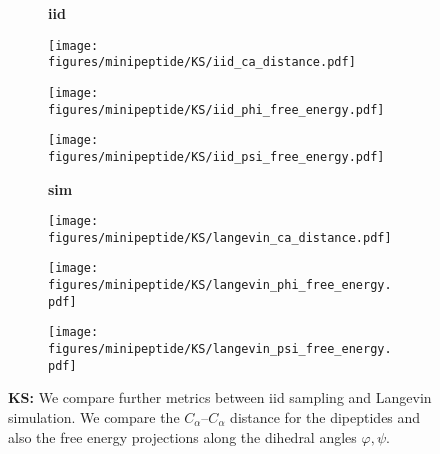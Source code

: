 \begin{figure}
    \centering
    \begin{minipage}{\textwidth}
        \centering
        \begin{subfigure}[c]{0.08\textwidth}
            \textbf{iid}
        \end{subfigure}
        \begin{subfigure}[c]{0.2\textwidth}
            \centering
            \texttt{[image: figures/minipeptide/KS/iid\_ca\_distance.pdf]}            
        \end{subfigure}
        \hspace{0.5cm}
        \begin{subfigure}[c]{0.2\textwidth}
            \centering
            \texttt{[image: figures/minipeptide/KS/iid\_phi\_free\_energy.pdf]}
        \end{subfigure}
        \hspace{0.5cm}
        \begin{subfigure}[c]{0.2\textwidth}
            \centering
            \texttt{[image: figures/minipeptide/KS/iid\_psi\_free\_energy.pdf]}
        \end{subfigure}
    \end{minipage}
    \vspace{0.5cm}
    \begin{minipage}{\textwidth}
        \centering
        \begin{subfigure}[c]{0.08\textwidth}
            \vspace{-0.5cm}
            \textbf{sim}
        \end{subfigure}
        \begin{subfigure}[c]{0.2\textwidth}
            \centering
            \texttt{[image: figures/minipeptide/KS/langevin\_ca\_distance.pdf]}
        \end{subfigure}
        \hspace{0.5cm}
        \begin{subfigure}[c]{0.2\textwidth}
            \centering
            \texttt{[image: figures/minipeptide/KS/langevin\_phi\_free\_energy.pdf]}
        \end{subfigure}
        \hspace{0.5cm}
        \begin{subfigure}[c]{0.2\textwidth}
            \centering
            \texttt{[image: figures/minipeptide/KS/langevin\_psi\_free\_energy.pdf]}
        \end{subfigure}
    \end{minipage}
    \caption{\textbf{KS:} We compare further metrics between iid sampling and Langevin simulation. We compare the $C_\alpha$--$C_\alpha$ distance for the dipeptides and also the free energy projections along the dihedral angles $\varphi, \psi$.}
    \label{fig:minipeptide-ks-more-metrics}
\end{figure}


